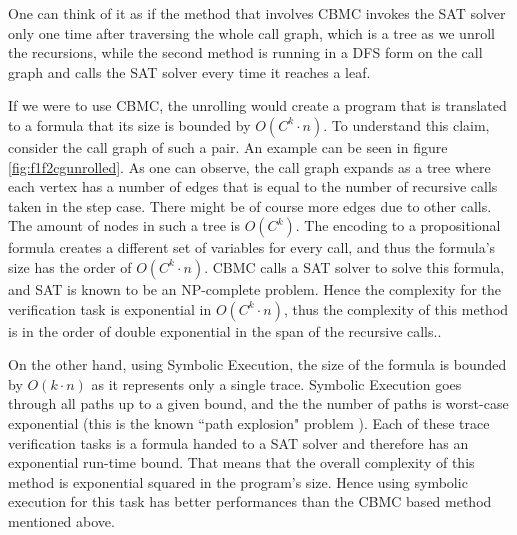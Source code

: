 One can think of it as if the method that involves CBMC invokes the SAT solver only one time after traversing the whole call graph, which is a tree as we unroll the recursions, while the second method is running in a DFS form on the call graph and calls the SAT solver every time it reaches a leaf.

If we were to use CBMC, the unrolling would create a program that is translated to a formula that its size is bounded by $O(C^k{\cdot}n)$. To understand this claim, consider the call graph of such a pair. An example can be seen in figure \ref{fig:f1f2cgunrolled}. As one can observe, the call graph expands as a tree where each vertex has a number of edges that is equal to the number of recursive calls taken in the step case. There might be of course more edges due to other calls. The amount of nodes in such a tree is $O(C^k)$. The encoding to a propositional formula creates a different set of variables for every call, and thus the formula's size has the order of $O(C^k{\cdot}n)$. CBMC calls a SAT solver to solve this formula, and SAT is known to be an NP-complete problem. Hence the complexity for the verification task is exponential in $O(C^k{\cdot}n)$, thus the complexity of this method is in the order of double exponential in the span of the recursive calls..  

On the other hand, using Symbolic Execution, the size of the formula is bounded by $O(k{\cdot}n)$ as it represents only a single trace. Symbolic Execution goes through all paths up to a given bound, and the the number of paths is worst-case exponential (this is the known ``path explosion" problem  \cite{10.1007/978-3-540-78800-3_28}). Each of these trace verification tasks is a formula handed to a SAT solver and therefore has an exponential run-time bound. That means that the overall complexity of this method is exponential squared in the program's size. 
Hence using symbolic execution for this task has better performances than the CBMC based method mentioned above.


